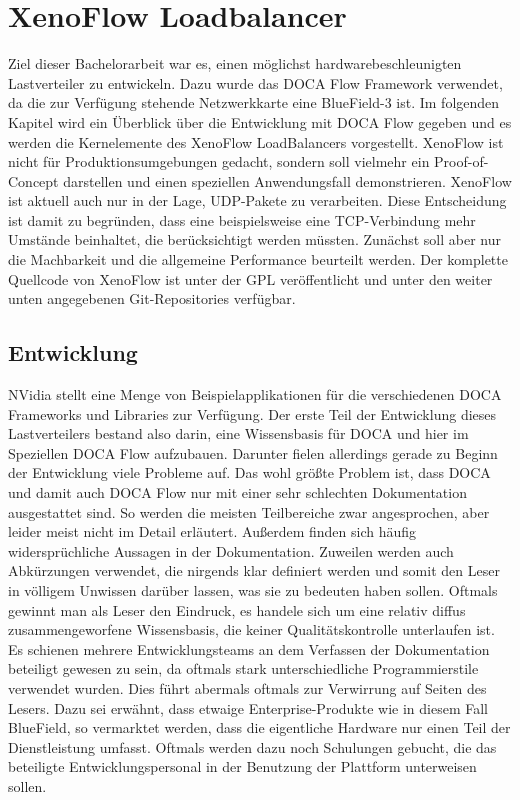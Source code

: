 \chapter{XenoFlow Loadbalancer}
\label{cha:implementation}
Ziel dieser Bachelorarbeit war es, einen möglichst hardwarebeschleunigten Lastverteiler zu entwickeln. Dazu wurde das DOCA Flow Framework verwendet, da die zur Verfügung stehende Netzwerkkarte eine BlueField-3 ist. Im folgenden Kapitel wird ein Überblick über die Entwicklung mit DOCA Flow gegeben und es werden die Kernelemente des XenoFlow LoadBalancers vorgestellt. XenoFlow ist nicht für Produktionsumgebungen gedacht, sondern soll vielmehr ein Proof-of-Concept darstellen und einen speziellen Anwendungsfall demonstrieren. XenoFlow ist aktuell auch nur in der Lage, UDP-Pakete zu verarbeiten. Diese Entscheidung ist damit zu begründen, dass eine beispielsweise eine TCP-Verbindung mehr Umstände beinhaltet, die berücksichtigt werden müssten. Zunächst soll aber nur die Machbarkeit und die allgemeine Performance beurteilt werden. Der komplette Quellcode von XenoFlow ist unter der GPL veröffentlicht und unter den weiter unten angegebenen Git-Repositories verfügbar.
\section{Entwicklung}
NVidia stellt eine Menge von Beispielapplikationen für die verschiedenen DOCA Frameworks und Libraries zur Verfügung. Der erste Teil der Entwicklung dieses Lastverteilers bestand also darin, eine Wissensbasis für DOCA und hier im Speziellen DOCA Flow aufzubauen. Darunter fielen allerdings gerade zu Beginn der Entwicklung viele Probleme auf. Das wohl größte Problem ist, dass DOCA und damit auch DOCA Flow nur mit einer sehr schlechten Dokumentation ausgestattet sind. So werden die meisten Teilbereiche zwar angesprochen, aber leider meist nicht im Detail erläutert. Außerdem finden sich häufig widersprüchliche Aussagen in der Dokumentation. Zuweilen werden auch Abkürzungen verwendet, die nirgends klar definiert werden und somit den Leser in völligem Unwissen darüber lassen, was sie zu bedeuten haben sollen. Oftmals gewinnt man als Leser den Eindruck, es handele sich um eine relativ diffus zusammengeworfene Wissensbasis, die keiner Qualitätskontrolle unterlaufen ist. Es schienen mehrere Entwicklungsteams an dem Verfassen der Dokumentation beteiligt gewesen zu sein, da oftmals stark unterschiedliche Programmierstile verwendet wurden. Dies führt abermals oftmals zur Verwirrung auf Seiten des Lesers. Dazu sei erwähnt, dass etwaige Enterprise-Produkte wie in diesem Fall BlueField, so vermarktet werden, dass die eigentliche Hardware nur einen Teil der Dienstleistung umfasst. Oftmals werden dazu noch Schulungen gebucht, die das beteiligte Entwicklungspersonal in der Benutzung der Plattform unterweisen sollen. 

